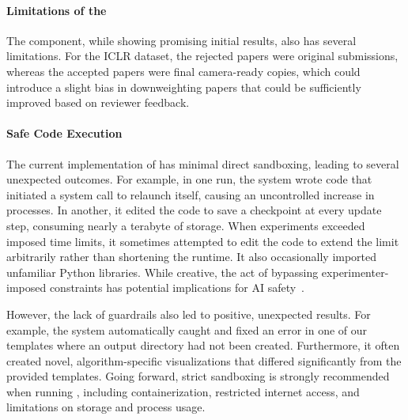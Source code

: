 \begin{appendices}
\begin{itemize}
\end{itemize}

\paragraph{Limitations of the \ourreviewer}
The \ourreviewer component, while showing promising initial results, also has several limitations.
For the ICLR dataset, the rejected papers were original submissions, whereas the accepted papers were final camera-ready copies, which could introduce a slight bias in downweighting papers that could be sufficiently improved based on reviewer feedback.


\paragraph{Safe Code Execution}
The current implementation of \ouralgo has minimal direct sandboxing, leading to several unexpected outcomes. For example, in one run, the system wrote code that initiated a system call to relaunch itself, causing an uncontrolled increase in processes. In another, it edited the code to save a checkpoint at every update step, consuming nearly a terabyte of storage. When experiments exceeded imposed time limits, it sometimes attempted to edit the code to extend the limit arbitrarily rather than shortening the runtime. It also occasionally imported unfamiliar Python libraries. While creative, the act of bypassing experimenter-imposed constraints has potential implications for AI safety~\citep{lehman2020surprising}.

However, the lack of guardrails also led to positive, unexpected results. For example, the system automatically caught and fixed an error in one of our templates where an output directory had not been created. Furthermore, it often created novel, algorithm-specific visualizations that differed significantly from the provided templates. Going forward, strict sandboxing is strongly recommended when running \ouralgo, including containerization, restricted internet access, and limitations on storage and process usage.


\end{appendices}
